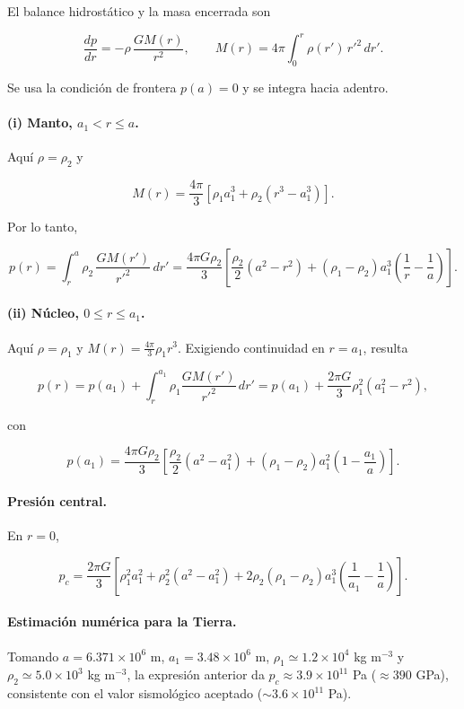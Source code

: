 El balance hidrostático y la masa encerrada son

$$ \frac{dp}{dr} = -\rho\,\frac{GM(r)}{r^2}, \qquad M(r) = 4\pi \int_0^r \rho(r')\, r'^2\, dr'. $$

Se usa la condición de frontera $p(a) = 0$ y se integra hacia adentro.

\paragraph{(i) Manto, $a_1 < r \le a$.} Aquí $\rho = \rho_2$ y

$$ M(r) = \frac{4\pi}{3}\left[\rho_1 a_1^3 + \rho_2\left(r^3 - a_1^3\right)\right]. $$

Por lo tanto,

$$ p(r) = \int_r^a \rho_2\,\frac{GM(r')}{r'^2}\,dr' = \frac{4\pi G \rho_2}{3}\left[\frac{\rho_2}{2}\left(a^2 - r^2\right) + (\rho_1 - \rho_2)a_1^3\left(\frac{1}{r} - \frac{1}{a}\right)\right]. $$

\paragraph{(ii) Núcleo, $0 \le r \le a_1$.} Aquí $\rho = \rho_1$ y $M(r) = \frac{4\pi}{3}\rho_1 r^3$. Exigiendo continuidad en $r = a_1$, resulta

$$ p(r) = p(a_1) + \int_r^{a_1} \rho_1 \frac{GM(r')}{r'^2}\,dr' = p(a_1) + \frac{2\pi G}{3}\rho_1^2\left(a_1^2 - r^2\right), $$

con

$$ p(a_1) = \frac{4\pi G\rho_2}{3}\left[\frac{\rho_2}{2}\left(a^2 - a_1^2\right) + (\rho_1 - \rho_2)a_1^2\left(1 - \frac{a_1}{a}\right)\right]. $$

\paragraph{Presión central.} En $r = 0$,

$$ p_c = \frac{2\pi G}{3}\left[\rho_1^2 a_1^2 + \rho_2^2\left(a^2 - a_1^2\right) + 2\rho_2(\rho_1 - \rho_2)a_1^3\left(\frac{1}{a_1} - \frac{1}{a}\right)\right]. $$

\paragraph{Estimación numérica para la Tierra.} Tomando $a = 6.371 \times 10^6$ m, $a_1 = 3.48 \times 10^6$ m, $\rho_1 \simeq 1.2 \times 10^4$ kg m$^{-3}$ y $\rho_2 \simeq 5.0 \times 10^3$ kg m$^{-3}$, la expresión anterior da $p_c \approx 3.9 \times 10^{11}$ Pa ($\approx 390$ GPa), consistente con el valor sismológico aceptado ($\sim 3.6 \times 10^{11}$ Pa).

